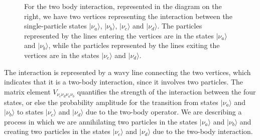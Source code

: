 \begin{figure}[H]
    \begin{minipage}{0.45\textwidth}
        For the two body interaction, represented in the diagram on the right, we have two vertices representing the interaction between the single-particle states \(|\nu_a\rangle\), \(|\nu_b\rangle\), \(|\nu_c\rangle\) and \(|\nu_d\rangle\). The particles represented by the lines entering the vertices are in the states \(|\nu_a\rangle\) and \(|\nu_b\rangle\), while the particles represented by the lines exiting the vertices are in the states \(|\nu_c\rangle\) and \(|\nu_d\rangle\).
    \end{minipage}
    \hfill
    \begin{minipage}{0.5\textwidth}
        \centering
    \end{minipage}
\end{figure}

The interaction is represented by a wavy line connecting the two vertices, which indicates that it is a two-body interaction, since it involves two particles. The matrix element \(V_{\nu_c\nu_d\nu_a\nu_b}\) quantifies the strength of the interaction between the four states, or else the probability amplitude for the transition from states \(|\nu_a\rangle\) and \(|\nu_b\rangle\) to states \(|\nu_c\rangle\) and \(|\nu_d\rangle\) due to the two-body operator. We are describing a process in which we are annihilating two particles in the states \(|\nu_a\rangle\) and \(|\nu_b\rangle\) and creating two particles in the states \(|\nu_c\rangle\) and \(|\nu_d\rangle\) due to the two-body interaction.
